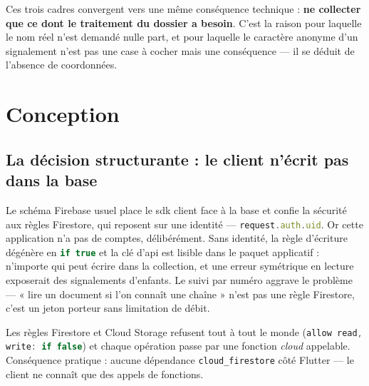 \documentclass[11pt,a4paper,oneside,openany]{report}
\begin{document}
\begin{decision}
\small
Ces trois cadres convergent vers une même conséquence technique : \textbf{ne
collecter que ce dont le traitement du dossier a besoin}. C'est la raison pour
laquelle le nom réel n'est demandé nulle part, et pour laquelle le caractère
anonyme d'un signalement n'est pas une case à cocher mais une conséquence — il
se déduit de l'absence de coordonnées.
\end{decision}

\chapter{Conception}
\label{chap:conception}

\section{La décision structurante : le client n'écrit pas dans la base}

Le schéma Firebase usuel place le \gls{sdk} client face à la base et confie la
sécurité aux règles Firestore, qui reposent sur une identité —
\lstinline[language=TypeScript]|request.auth.uid|. Or cette application n'a pas de
comptes, délibérément. Sans identité, la règle d'écriture dégénère en
\lstinline[language=TypeScript]|if true| et la clé d'\gls{api} est lisible dans le
paquet applicatif : n'importe qui peut écrire dans la collection, et une erreur
symétrique en lecture exposerait des signalements d'enfants. Le suivi par numéro
aggrave le problème — « lire un document si l'on connaît une chaîne » n'est pas
une règle Firestore, c'est un jeton porteur sans limitation de débit.

\begin{decision}
\small
Les règles Firestore et Cloud Storage refusent tout à tout le monde
(\lstinline[language=TypeScript]|allow read, write: if false|) et chaque
opération passe par une fonction \emph{cloud} appelable. Conséquence pratique :
aucune dépendance \texttt{cloud\_firestore} côté Flutter — le client ne connaît
que des appels de fonctions.
\end{decision}
\end{document}
